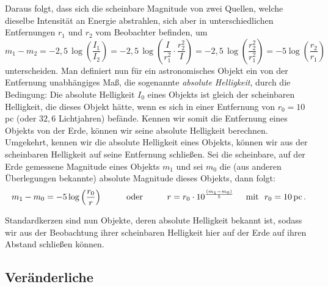 Daraus folgt, dass sich die scheinbare Magnitude von zwei Quellen, welche dieselbe Intensit\"at an Energie
abstrahlen, sich aber in unterschiedlichen Entfernungen $r_1$ und $r_2$ vom Beobachter befinden,
um     
\begin{equation}
       m_1 - m_2 = - 2,5\, \log \left( \frac{I_1}{I_2} \right) =  - 2,5\, \log \left( \frac{I }{ r_1^2} \cdot \frac{r_2^2 }{I} \right)
               =  - 2,5\, \log \left( \frac{r_2^2}{r_1^2} \right)  = - 5 \log  \left( \frac{r_2}{r_1} \right) 
\end{equation} 
unterscheiden. Man definiert nun f\"ur ein astronomisches Objekt ein von der Entfernung unabh\"angiges Ma\ss,
die sogenannte \textit{absolute Helligkeit}, 
durch die Bedingung: Die absolute Helligkeit $I_0$ eines Objekts ist
gleich der scheinbaren Helligkeit, die dieses Objekt h\"atte, wenn es sich in einer Entfernung von 
$r_0=10$\,pc (oder $32,6$ Lichtjahren) bef\"ande. Kennen wir somit die Entfernung eines Objekts von der Erde,
k\"onnen wir seine absolute Helligkeit berechnen. Umgekehrt, kennen wir die absolute Helligkeit eines
Objekts, k\"onnen wir aus der scheinbaren Helligkeit auf seine Entfernung schlie\ss en. Sei die
scheinbare, auf der Erde gemessene Magnitude eines Objekts $m_1$ und sei $m_0$ die (aus anderen
\"Uberlegungen bekannte) absolute Magnitude dieses Objekts, dann folgt:
\begin{equation}
           m_1 - m_0 = - 5 \log \left( \frac{r_0}{r} \right)  \hspace{1cm} {\rm oder} \hspace{1cm}
             r =  r_0 \cdot 10^{\frac{(m_1-m_0)}{5}}  \hspace{0.5cm} {\rm mit}~~ r_0=10\,{\rm pc} \, .
\end{equation}

Standardkerzen sind nun Objekte, deren absolute Helligkeit bekannt ist, sodass wir aus der Beobachtung
ihrer scheinbaren Helligkeit hier auf der Erde auf ihren Abstand schlie\ss en k\"onnen.

\subsection{Ver\"anderliche}

